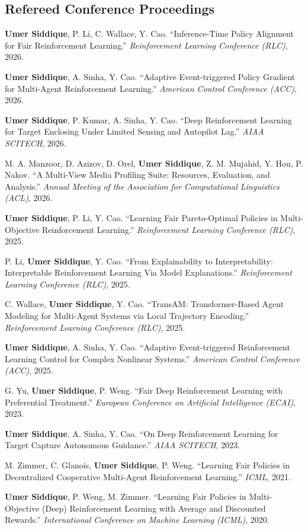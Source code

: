 \documentclass[letterpaper,11pt]{article}
\begin{document}
\subsection*{Refereed Conference Proceedings}
\begin{publist}[label={[C\arabic*]}]
    \item \textbf{Umer Siddique}, P. Li, C. Wallace, Y. Cao. ``Inference-Time Policy Alignment for Fair Reinforcement Learning.'' \textit{Reinforcement Learning Conference (RLC)}, 2026.
    \item \textbf{Umer Siddique}, A. Sinha, Y. Cao. ``Adaptive Event-triggered Policy Gradient for Multi-Agent Reinforcement Learning.'' \textit{American Control Conference (ACC)}, 2026.
    \item \textbf{Umer Siddique}, P. Kumar, A. Sinha, Y. Cao. ``Deep Reinforcement Learning for Target Enclosing Under Limited Sensing and Autopilot Lag.'' \textit{AIAA SCITECH}, 2026.
    \item M. A. Manzoor, D. Azizov, D. Orel, \textbf{Umer Siddique}, Z. M. Mujahid, Y. Hou, P. Nakov. ``A Multi-View Media Profiling Suite: Resources, Evaluation, and Analysis.'' \textit{Annual Meeting of the Association for Computational Linguistics (ACL)}, 2026.
    \item \textbf{Umer Siddique}, P. Li, Y. Cao. ``Learning Fair Pareto-Optimal Policies in Multi-Objective Reinforcement Learning.'' \textit{Reinforcement Learning Conference (RLC)}, 2025.
    \item P. Li, \textbf{Umer Siddique}, Y. Cao. ``From Explainability to Interpretability: Interpretable Reinforcement Learning Via Model Explanations.'' \textit{Reinforcement Learning Conference (RLC)}, 2025.
    \item C. Wallace, \textbf{Umer Siddique}, Y. Cao. ``TransAM: Transformer-Based Agent Modeling for Multi-Agent Systems via Local Trajectory Encoding.'' \textit{Reinforcement Learning Conference (RLC)}, 2025.
    \item \textbf{Umer Siddique}, A. Sinha, Y. Cao. ``Adaptive Event-triggered Reinforcement Learning Control for Complex Nonlinear Systems.'' \textit{American Control Conference (ACC)}, 2025.
    \item G. Yu, \textbf{Umer Siddique}, P. Weng. ``Fair Deep Reinforcement Learning with Preferential Treatment.'' \textit{European Conference on Artificial Intelligence (ECAI)}, 2023.
    \item \textbf{Umer Siddique}, A. Sinha, Y. Cao. ``On Deep Reinforcement Learning for Target Capture Autonomous Guidance.'' \textit{AIAA SCITECH}, 2023.
    \item M. Zimmer, C. Glanois, \textbf{Umer Siddique}, P. Weng. ``Learning Fair Policies in Decentralized Cooperative Multi-Agent Reinforcement Learning.'' \textit{ICML}, 2021.
    \item \textbf{Umer Siddique}, P. Weng, M. Zimmer. ``Learning Fair Policies in Multi-Objective (Deep) Reinforcement Learning with Average and Discounted Rewards.'' \textit{International Conference on Machine Learning (ICML)}, 2020.
\end{publist}
\end{document}
